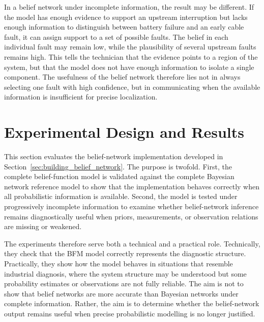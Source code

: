 \documentclass[runningheads]{llncs}
\begin{document}
In a belief network under incomplete information, the result may be different. If the model has enough evidence to support an upstream interruption but lacks enough information to distinguish between battery failure and an early cable fault, it can assign support to a set of possible faults. The belief in each individual fault may remain low, while the plausibility of several upstream faults remains high. This tells the technician that the evidence points to a region of the system, but that the model does not have enough information to isolate a single component. The usefulness of the belief network therefore lies not in always selecting one fault with high confidence, but in communicating when the available information is insufficient for precise localization.

\section{Experimental Design and Results}
\label{sec:experimental_results}

This section evaluates the belief-network implementation developed in Section~\ref{sec:building_belief_network}. The purpose is twofold. First, the complete belief-function model is validated against the complete Bayesian network reference model to show that the implementation behaves correctly when all probabilistic information is available. Second, the model is tested under progressively incomplete information to examine whether belief-network inference remains diagnostically useful when priors, measurements, or observation relations are missing or weakened.

The experiments therefore serve both a technical and a practical role. Technically, they check that the BFM model correctly represents the diagnostic structure. Practically, they show how the model behaves in situations that resemble industrial diagnosis, where the system structure may be understood but some probability estimates or observations are not fully reliable. The aim is not to show that belief networks are more accurate than Bayesian networks under complete information. Rather, the aim is to determine whether the belief-network output remains useful when precise probabilistic modelling is no longer justified.
\end{document}
